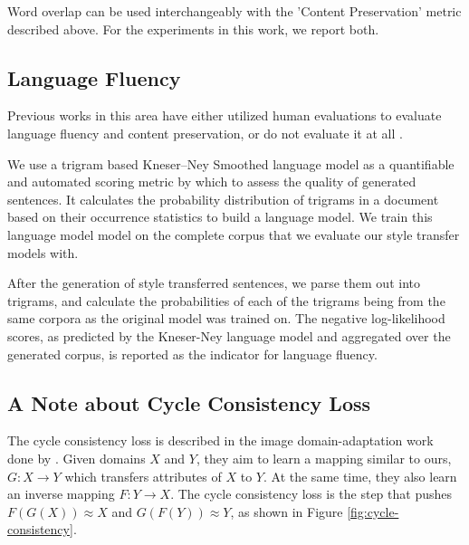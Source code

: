 Word overlap can be used interchangeably with the 'Content Preservation' metric described above. For the experiments in this work, we report both.


\subsection{Language Fluency}

Previous works in this area have either utilized human evaluations \citep{shen2017style,fu2017style} to evaluate language fluency and content preservation, or do not evaluate it at all \citep{hu2017toward}.

We use a trigram based Kneser–Ney Smoothed language model \citep{kneser1995improved} as a quantifiable and automated scoring metric by which to assess the quality of generated sentences. It calculates the probability distribution of trigrams in a document based on their occurrence statistics to build a language model. We train this language model model on the complete corpus that we evaluate our style transfer models with.

After the generation of style transferred sentences, we parse them out into trigrams, and calculate the probabilities of each of the trigrams being from the same corpora as the original model was trained on. The negative log-likelihood scores, as predicted by the Kneser-Ney language model and aggregated over the generated corpus, is reported as the indicator for language fluency.


\subsection{A Note about Cycle Consistency Loss}

The cycle consistency loss is described in the image domain-adaptation work done by \cite{zhu2017unpaired}. Given domains $X$ and $Y$, they aim to learn a mapping similar to ours, $G: X \rightarrow Y$ which transfers attributes of $X$ to $Y$. At the same time, they also learn an inverse mapping $F: Y \rightarrow X$. The cycle consistency loss is the step that pushes $F(G(X)) \approx X$ and $G(F(Y)) \approx Y$, as shown in Figure \ref{fig:cycle-consistency}.

